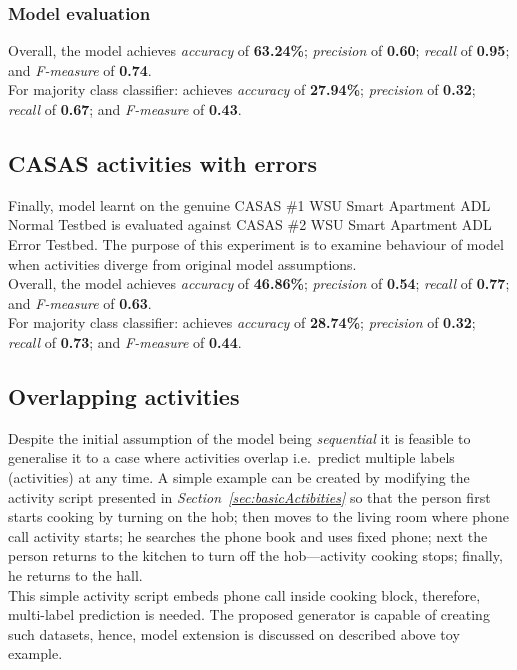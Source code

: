 \documentclass[10pt, a4paper, pdflatex, leqno, twoside, openright]{report}
\begin{document}
      \subsubsection{Model evaluation}
Overall, the model achieves \emph{accuracy} of \textbf{63.24\%}; \emph{precision} of \textbf{0.60}; \emph{recall} of \textbf{0.95}; and \emph{F-measure} of \textbf{0.74}.\\

For majority class classifier: achieves \emph{accuracy} of \textbf{27.94\%}; \emph{precision} of \textbf{0.32}; \emph{recall} of \textbf{0.67}; and \emph{F-measure} of \textbf{0.43}.

    \subsection{CASAS activities with errors}
Finally, model learnt on the genuine CASAS \#1 WSU Smart Apartment ADL Normal Testbed is evaluated against CASAS \#2 WSU Smart Apartment ADL Error Testbed. The purpose of this experiment is to examine behaviour of model when activities diverge from original model assumptions.\\

Overall, the model achieves \emph{accuracy} of \textbf{46.86\%}; \emph{precision} of \textbf{0.54}; \emph{recall} of \textbf{0.77}; and \emph{F-measure} of \textbf{0.63}.\\

For majority class classifier: achieves \emph{accuracy} of \textbf{28.74\%}; \emph{precision} of \textbf{0.32}; \emph{recall} of \textbf{0.73}; and \emph{F-measure} of \textbf{0.44}.

    \subsection{Overlapping activities\label{sec:singleML}}
Despite the initial assumption of the model being \emph{sequential} it is feasible to generalise it to a case where activities overlap i.e.\ predict multiple labels (activities) at any time. A simple example can be created by modifying the activity script presented in \emph{Section~\ref{sec:basicActibities}} so that the person first starts cooking by turning on the hob; then moves to the living room where phone call activity starts; he searches the phone book and uses fixed phone; next the person returns to the kitchen to turn off the hob---activity cooking stops; finally, he returns to the hall.\\
This simple activity script embeds phone call inside cooking block, therefore, multi-label prediction is needed. The proposed generator is capable of creating such datasets, hence, model extension is discussed on described above toy example.\\
\end{document}
